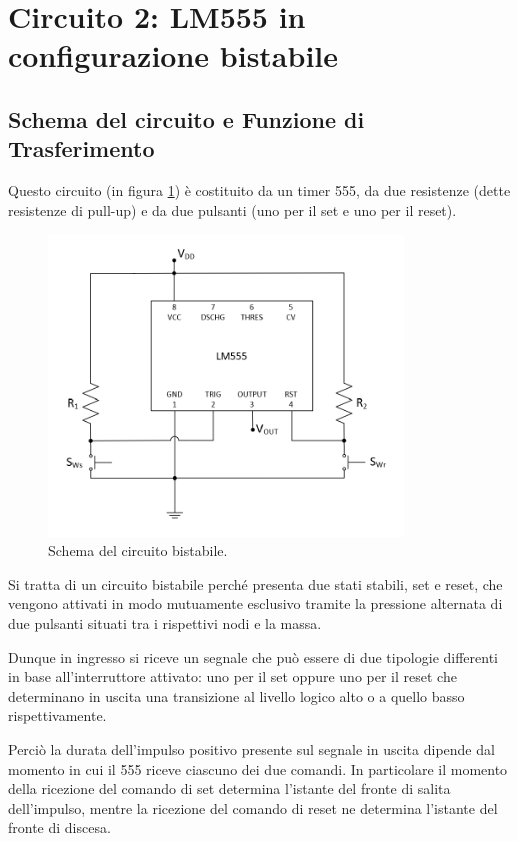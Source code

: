 \documentclass{report}
\begin{document}
\newpage
\section{Circuito 2: LM555 in configurazione bistabile}\label{sez2}
\subsection{Schema del circuito e Funzione di Trasferimento}
Questo circuito (in figura \ref{figura:schema2}) è costituito da un timer 555, da due resistenze (dette resistenze di pull-up) e da due pulsanti (uno per il set e uno per il reset).

\begin{figure}[h!]
	\centering
	\includegraphics[height=8cm]{immagini/schema2}
	\caption{Schema del circuito bistabile.}
	\label{figura:schema2}
\end{figure}

\noindent Si tratta di un circuito bistabile perché presenta due stati stabili, set e reset, che vengono attivati in modo mutuamente esclusivo tramite la pressione alternata di due pulsanti situati tra i rispettivi nodi e la massa.

Dunque in ingresso si riceve un segnale che può essere di due tipologie differenti in base all'interruttore attivato: uno per il set oppure uno per il reset che determinano in uscita una transizione al livello logico alto o a quello basso rispettivamente.

Perciò la durata dell'impulso positivo presente sul segnale in uscita dipende dal momento in cui il 555 riceve ciascuno dei due comandi. In particolare il momento della ricezione del comando di set determina l'istante del fronte di salita dell'impulso, mentre la ricezione del comando di reset ne determina l'istante del fronte di discesa.
\end{document}
